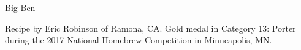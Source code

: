 \begin{recipe}{Big Ben} %

\begin{aboutblock}
Recipe by Eric Robinson of Ramona, CA. Gold medal in Category 13: Porter during the
2017 National Homebrew Competition in Minneapolis, MN.
\sourceaha
\end{aboutblock}


\begin{methodandtiming}

\begin{mashsteps}
\end{mashsteps}

\begin{fermentationsteps}
\end{fermentationsteps}

\end{methodandtiming}

\recipebreak

\begin{ingredientsblock}

\begin{malts}
\end{malts}

\begin{hops}
\end{hops}


\end{ingredientsblock}

\end{recipe}

